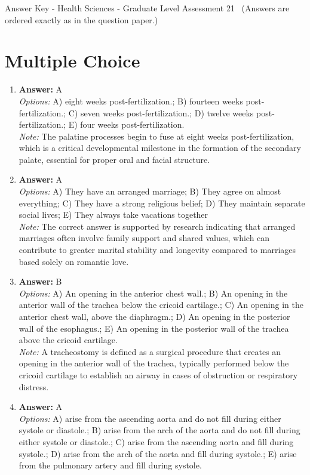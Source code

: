 \documentclass[12pt]{article}
\begin{document}
\begin{center}
Answer Key - Health Sciences - Graduate Level Assessment 21 \
\small (Answers are ordered exactly as in the question paper.)
\end{center}

\section*{Multiple Choice}
\begin{enumerate}[label=\arabic*.]
\item \textbf{Answer:} A
\\ \textit{Options:} A) eight weeks post-fertilization.; B) fourteen weeks post-fertilization.; C) seven weeks post-fertilization.; D) twelve weeks post-fertilization.; E) four weeks post-fertilization.
\\ \textit{Note:} The palatine processes begin to fuse at eight weeks post-fertilization, which is a critical developmental milestone in the formation of the secondary palate, essential for proper oral and facial structure.
\item \textbf{Answer:} A
\\ \textit{Options:} A) They have an arranged marriage; B) They agree on almost everything; C) They have a strong religious belief; D) They maintain separate social lives; E) They always take vacations together
\\ \textit{Note:} The correct answer is supported by research indicating that arranged marriages often involve family support and shared values, which can contribute to greater marital stability and longevity compared to marriages based solely on romantic love.
\item \textbf{Answer:} B
\\ \textit{Options:} A) An opening in the anterior chest wall.; B) An opening in the anterior wall of the trachea below the cricoid cartilage.; C) An opening in the anterior chest wall, above the diaphragm.; D) An opening in the posterior wall of the esophagus.; E) An opening in the posterior wall of the trachea above the cricoid cartilage.
\\ \textit{Note:} A tracheostomy is defined as a surgical procedure that creates an opening in the anterior wall of the trachea, typically performed below the cricoid cartilage to establish an airway in cases of obstruction or respiratory distress.
\item \textbf{Answer:} A
\\ \textit{Options:} A) arise from the ascending aorta and do not fill during either systole or diastole.; B) arise from the arch of the aorta and do not fill during either systole or diastole.; C) arise from the ascending aorta and fill during systole.; D) arise from the arch of the aorta and fill during systole.; E) arise from the pulmonary artery and fill during systole.

\end{enumerate}
\end{document}

